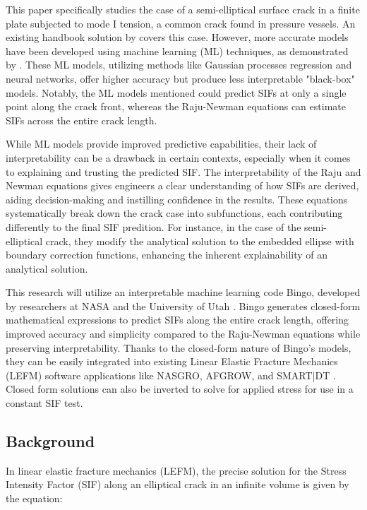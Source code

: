 This paper specifically studies the case of a semi-elliptical surface crack in a finite plate subjected to mode I tension, a common crack found in pressure vessels. An existing handbook solution by \cite{RNeqnsbook} covers this case. However, more accurate models have been developed using machine learning (ML) techniques, as demonstrated by \cite{Keprate2017, Xu2022, Seghier2020}. These ML models, utilizing methods like Gaussian processes regression and neural networks, offer higher accuracy but produce less interpretable "black-box" models. Notably, the ML models mentioned could predict SIFs at only a single point along the crack front, whereas the Raju-Newman equations can estimate SIFs across the entire crack length.

While ML models provide improved predictive capabilities, their lack of interpretability can be a drawback in certain contexts, especially when it comes to explaining and trusting the predicted SIF. The interpretability of the Raju and Newman equations gives engineers a clear understanding of how SIFs are derived, aiding decision-making and instilling confidence in the results. These equations systematically break down the crack case into subfunctions, each contributing differently to the final SIF predition. For instance, in the case of the semi-elliptical crack, they modify the analytical solution to the embedded ellipse with boundary correction functions, enhancing the inherent explainability of an analytical solution.

This research will utilize an interpretable machine learning code Bingo, developed by researchers at NASA and the University of Utah \cite{Randall2022}. Bingo generates closed-form mathematical expressions to predict SIFs along the entire crack length, offering improved accuracy and simplicity compared to the Raju-Newman equations while preserving interpretability. Thanks to the closed-form nature of Bingo's models, they can be easily integrated into existing Linear Elastic Fracture Mechanics (LEFM) software applications like NASGRO, AFGROW, and SMART|DT \cite{nasgro, afgrow, smartdt}. Closed form solutions can also be inverted to solve for applied stress for use in a constant SIF test.

\subsection{Background}
In linear elastic fracture mechanics (LEFM), the precise solution for the Stress Intensity Factor (SIF) along an elliptical crack in an infinite volume is given by the equation:

